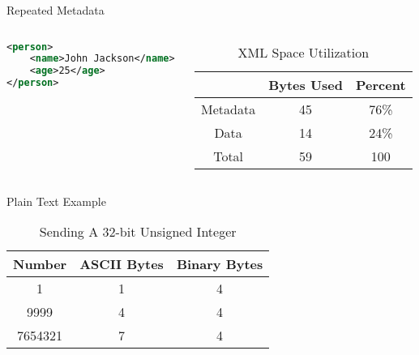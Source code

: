 \documentclass{beamer}
\begin{document}
\begin{frame}[fragile]{Repeated Metadata}
	\begin{columns}
		\begin{column}{0.5\textwidth}
			\begin{lstlisting}[language=XML]
<person>
	<name>John Jackson</name>
	<age>25</age>
</person>
\end{lstlisting}
		\end{column}
		\begin{column}{0.5\textwidth}
			\begin{table}
				\caption{XML Space Utilization}
				\center
				\begin{tabular}{|c|c|c|}
					\hline
					\textbf{} & \textbf{Bytes Used} & \textbf{Percent} \\
					\hline
					Metadata  & 45                  & 76\%             \\
					Data      & 14                  & 24\%             \\
					\hline
					Total     & 59                  & 100              \\
					\hline
				\end{tabular}
			\end{table}
		\end{column}
	\end{columns}
\end{frame}

\begin{frame}[fragile]{Plain Text Example}
	\begin{table}
		\caption{Sending A 32-bit Unsigned Integer}
		\begin{center}
			\begin{tabular}{|c|c|c|}
				\hline
				\textbf{Number} & \textbf{ASCII Bytes} & \textbf{Binary Bytes} \\
				\hline
				1               & 1                    & 4                     \\
				9999            & 4                    & 4                     \\
				7654321         & 7                    & 4                     \\
				\hline
			\end{tabular}
		\end{center}
	\end{table}
\end{frame}
\end{document}
